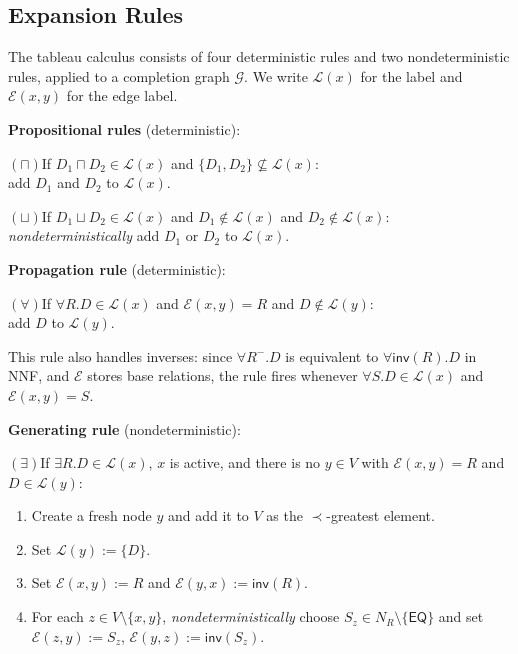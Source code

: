 \documentclass[a4paper,11pt]{article}
\theoremstyle{definition}
\newcommand{\NR}{\ensuremath{N_R}}
\newcommand{\EQ}{\ensuremath{\mathsf{EQ}}}
\newcommand{\inv}{\ensuremath{\mathsf{inv}}}
\begin{document}
\subsection{Expansion Rules}
\label{sec:tab-rules}

The tableau calculus consists of four deterministic rules and two
nondeterministic rules, applied to a completion graph $\mathcal{G}$.
We write $\mathcal{L}(x)$ for the label and $\mathcal{E}(x,y)$ for
the edge label.

\medskip
\noindent\textbf{Propositional rules} (deterministic):

\smallskip
\noindent$(\sqcap)$\quad If $D_1 \sqcap D_2 \in \mathcal{L}(x)$ and
$\{D_1, D_2\} \not\subseteq \mathcal{L}(x)$: \\
\hspace*{2em} add $D_1$ and $D_2$ to $\mathcal{L}(x)$.

\smallskip
\noindent$(\sqcup)$\quad If $D_1 \sqcup D_2 \in \mathcal{L}(x)$ and
$D_1 \notin \mathcal{L}(x)$ and $D_2 \notin \mathcal{L}(x)$: \\
\hspace*{2em} \emph{nondeterministically} add $D_1$ or $D_2$ to
$\mathcal{L}(x)$.

\medskip
\noindent\textbf{Propagation rule} (deterministic):

\smallskip
\noindent$(\forall)$\quad If $\forall R.D \in \mathcal{L}(x)$ and
$\mathcal{E}(x,y) = R$ and $D \notin \mathcal{L}(y)$: \\
\hspace*{2em} add $D$ to $\mathcal{L}(y)$.

\smallskip
\noindent This rule also handles inverses: since $\forall R^-.D$ is
equivalent to $\forall \inv(R).D$ in NNF, and $\mathcal{E}$ stores
base relations, the rule fires whenever $\forall S.D \in
\mathcal{L}(x)$ and $\mathcal{E}(x,y) = S$.

\medskip
\noindent\textbf{Generating rule} (nondeterministic):

\smallskip
\noindent$(\exists)$\quad If $\exists R.D \in \mathcal{L}(x)$, $x$ is
active, and there is no $y \in V$ with $\mathcal{E}(x,y) = R$ and
$D \in \mathcal{L}(y)$:
\begin{enumerate}[nosep,label=\arabic*.]
  \item Create a fresh node $y$ and add it to $V$ as the
    $\prec$-greatest element.
  \item Set $\mathcal{L}(y) := \{D\}$.
  \item Set $\mathcal{E}(x,y) := R$ and $\mathcal{E}(y,x) := \inv(R)$.
  \item For each $z \in V \setminus \{x, y\}$,
    \emph{nondeterministically} choose $S_z \in \NR \setminus \{\EQ\}$
    and set $\mathcal{E}(z,y) := S_z$, $\mathcal{E}(y,z) :=
    \inv(S_z)$.
\end{enumerate}
\end{document}
